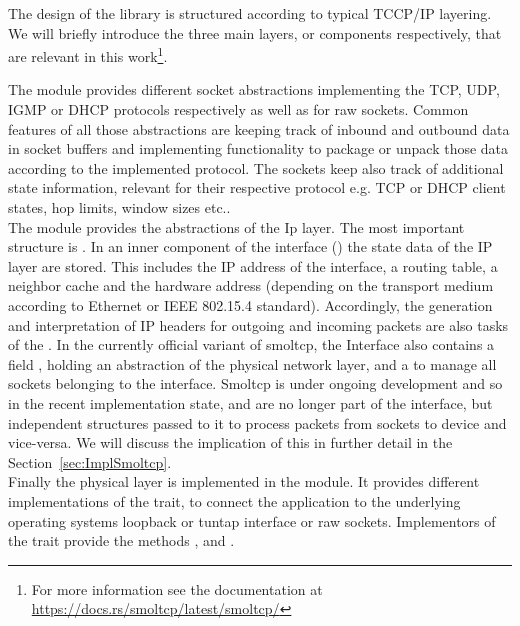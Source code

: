 The design of the library is structured according to typical TCCP/IP layering. We will briefly introduce the three main layers, or components respectively, that are relevant in this work\footnote{For more information see the documentation at \url{https://docs.rs/smoltcp/latest/smoltcp/}}.


The  module provides different socket abstractions implementing the TCP, UDP, IGMP or DHCP protocols respectively as well as for raw sockets. Common features of all those abstractions are keeping track of inbound and outbound data in socket buffers and implementing functionality to package or unpack those data according to the implemented protocol. The sockets keep also track of additional state information, relevant for their respective protocol e.g. TCP or DHCP client states, hop limits, window sizes etc..\\

The  module provides the abstractions of the Ip layer. The most important structure is . In an inner component of the interface () the state data of the IP layer are stored. This includes the IP address of the interface, a routing table, a neighbor cache and the hardware address (depending on the transport medium according to Ethernet or IEEE 802.15.4 standard). Accordingly, the generation and interpretation of IP headers for outgoing and incoming packets are also tasks of the 
. In the currently official variant of smoltcp, the Interface also contains a field , holding an abstraction of the physical network layer, and a  to manage all sockets belonging to the interface. Smoltcp is under ongoing development and so in the recent implementation state,  and  are no longer part of the interface, but independent structures passed to it to process packets from sockets to device and vice-versa. We will discuss the implication of this in further detail in the Section~\ref{sec:ImplSmoltcp}. \\

Finally the physical layer is implemented in the  module. It provides different implementations of the  trait, to connect the application to the underlying operating systems loopback or tuntap interface or raw sockets. Implementors of the  trait provide the methods ,  and .\\


